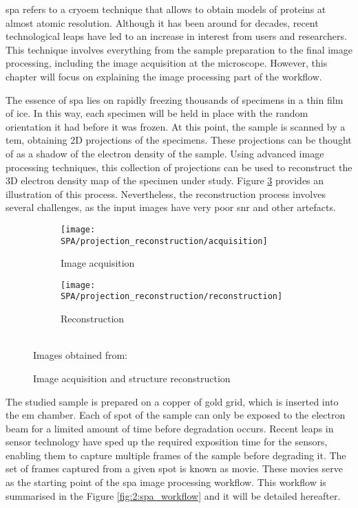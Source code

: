 \documentclass[../main.tex]{subfiles}
\begin{document}
\Gls{spa} refers to a \gls{cryoem} technique that allows to obtain models of proteins at almost atomic resolution. Although it has been around for decades, recent technological leaps have led to an increase in interest from users and researchers. This technique involves everything from the sample preparation to the final image processing, including the image acquisition at the microscope\cite{dimitry2019}. However, this chapter will focus on explaining the image processing part of the workflow.

The essence of \gls{spa} lies on rapidly freezing thousands of specimens in a thin film of ice. In this way, each specimen will be held in place with the random orientation it had before it was frozen. At this point, the sample is scanned by a \gls{tem}, obtaining 2D projections of the specimens. These projections can be thought of as a shadow of the electron density of the sample. Using advanced image processing techniques, this collection of projections can be used to reconstruct the 3D electron density map of the specimen under study. Figure \ref{fig:2:acquisition_reconstruction} provides an illustration of this process. Nevertheless, the reconstruction process involves several challenges, as the input images have very poor \gls{snr} and other artefacts.

\begin{figure}[htbp]
    \centering
    \begin{subfigure}[b]{0.45\textwidth}
         \centering
         \texttt{[image: SPA/projection\_reconstruction/acquisition]}
         \caption{Image acquisition}
         \label{fig:2:projection_reconstruction:acquisition}
    \end{subfigure}
    \hfill
    \begin{subfigure}[b]{0.45\textwidth}
         \centering
         \texttt{[image: SPA/projection\_reconstruction/reconstruction]}
         \caption{Reconstruction}
         \label{fig:2:projection_reconstruction:reconstruction}
    \end{subfigure}\\
    Images obtained from: \cite{greg}
    \caption{Image acquisition and structure reconstruction}
    \label{fig:2:acquisition_reconstruction}
\end{figure}

The studied sample is prepared on a copper of gold grid, which is inserted into the \gls{em} chamber. Each of spot of the sample can only be exposed to the electron beam for a limited amount of time before degradation occurs. Recent leaps in sensor technology have sped up the required exposition time for the sensors, enabling them to capture multiple frames of the sample before degrading it. The set of frames captured from a given spot is known as movie. These movies serve as the starting point of the \gls{spa} image processing workflow. This workflow is summarised in the Figure \ref{fig:2:spa_workflow} and it will be detailed hereafter. 
\end{document}
